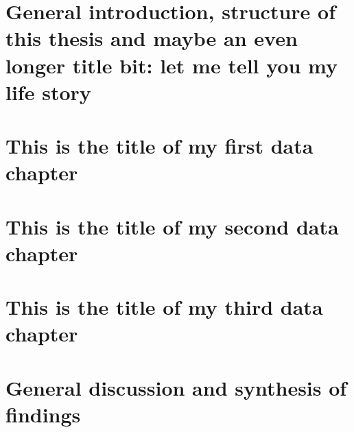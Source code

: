 \documentclass[12pt, a4paper, twoside, openright, final]{report}
\begin{document}
 

\chapter[General introduction and structure of this thesis
       ]{General introduction, structure of this thesis and maybe an even longer title bit: let me tell you my life story
       }\label{chap:gen-intro}

    
\chapter[This is the title of my first data chapter
       ]{This is the title of my first data chapter
       }\label{chap:1st-data}


\chapter[This is the title of my second data chapter
       ]{This is the title of my second data chapter
       }\label{chap:2nd-data}

    
\chapter[This is the title of my third data chapter
       ]{This is the title of my third data chapter
       }\label{chap:3rd-data}

    
\chapter[General discussion
       ]{General discussion and synthesis of findings
       }\label{chap:gen-disc}

\end{document}
